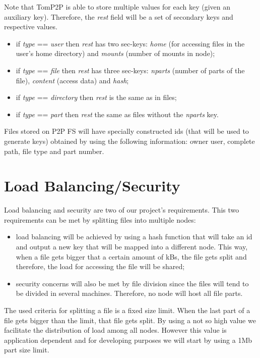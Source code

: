 \documentclass[times,9pt,article]{llncs}
\begin{document}
Note that TomP2P is able to store multiple values for each key (given an 
auxiliary key). Therefore, the \emph{rest} field will be a set of secondary
keys and respective values.

\begin{itemize}
\item if \emph{type} == \emph{user} then \emph{rest} has two sec-keys: \emph{home} (for accessing files in the user's home directory) and \emph{mounts} (number of mounts in node);
\item if \emph{type} == \emph{file} then \emph{rest} has three sec-keys: \emph{nparts} (number of parts of the file), \emph{content} (access data) and \emph{hash};
\item if \emph{type} == \emph{directory} then \emph{rest} is the same as in files;
\item if \emph{type} == \emph{part} then \emph{rest} the same as files without the \emph{nparts} key.
\end{itemize}


Files stored on P2P FS will have specially constructed ids (that will be used to
generate keys) obtained by using the following information: owner user, complete 
path, file type and part number.

\section{Load Balancing/Security}

Load balancing and security are two of our project's requirements. This two 
requirements can be met by splitting files into multiple nodes:
\begin{itemize}
\item load balancing will be achieved by using a hash function that will take
an id and output a new key that will be mapped into a different node. This way,
when a file gets bigger that a certain amount of kBs, the file gets split and
therefore, the load for accessing the file will be shared;
\item security concerns will also be met by file division since the files will
tend to be divided in several machines. Therefore, no node will host all file
parts.
\end{itemize}
The used criteria for splitting a file is a fixed size limit. When the last part
of a file gets bigger than the limit, that file gets split. By using a not so high
value we facilitate the distribution of load among all nodes. However this value
is application dependent and for developing purposes we will start by using a
1Mb part size limit.   
\end{document}
